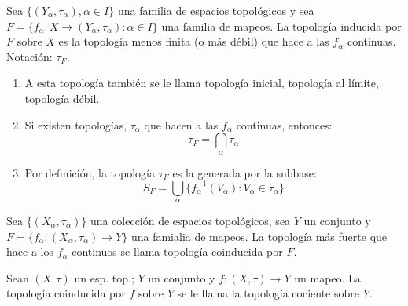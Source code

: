 \begin{definicion}
    Sea $\{(Y_\alpha, \tau_\alpha),\alpha\in I\}$ una familia de espacios topológicos y sea $F=\{f_\alpha: X\to (Y_\alpha,\tau_\alpha):\alpha \in I \}$ una familia de mapeos. La topología inducida por $F$ sobre $X$ es la topología menos finita (o más débil) que hace a las $f_\alpha$ continuas. Notación: $\tau_F$.  
\end{definicion}
\begin{nota}
    \begin{enumerate}
        \item A esta topología también se le llama topología inicial, topología al límite, topología débil. 
        \item Si existen topologías, $\tau_\alpha$ que hacen a las $f_\alpha$ continuas, entonces: 
        $$\tau_F= \bigcap_\alpha \tau_\alpha$$
        \item Por definición, la topología $\tau_F$ es la generada por la subbase: 
        $$S_F=\bigcup_\alpha \{f_\alpha^{-1}(V_\alpha): V_\alpha \in \tau_\alpha\}$$
    \end{enumerate}
    
\end{nota}

\begin{definicion}
    Sea $\{(X_\alpha,\tau_\alpha)\}$ una colección de espacios topológicos, sea $Y$ un conjunto y $F=\{f_\alpha: (X_\alpha,\tau_\alpha)\to Y\}$ una famialia de mapeos. La topología más fuerte que hace a los $f_\alpha$ continuos se llama topología coinducida por $F$. 
\end{definicion}

\begin{nota}
    Sean $(X,\tau)$ un esp. top.; $Y$ un conjunto y $f:(X,\tau)\to Y$ un mapeo. La topología coinducida por $f$ sobre $Y$ se le llama la topología cociente sobre $Y$. 
\end{nota}


